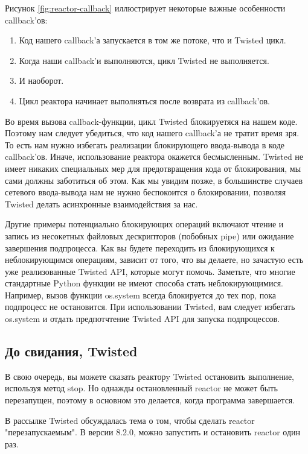 Рисунок \ref{fig:reactor-callback} иллюстрирует некоторые важные особенности 
callback'ов:

\begin{enumerate}
\item Код нашего callback'а запускается в том же потоке, что и Twisted цикл.
\item Когда наши callback'и выполняются, цикл Twisted не выполняется. 
\item И наоборот.
\item Цикл реактора начинает выполняться после возврата из callback'ов.
\end{enumerate}


Во время вызова callback-функции, цикл Twisted 
блокируетяся на нашем коде. Поэтому нам следует 
убедиться, что код нашего callback'а не тратит 
время зря. То есть нам нужно избегать реализации 
блокирующего ввода-вывода в коде callback'ов. 
Иначе, использование реактора окажется бесмысленным. 
Twisted не имеет никаких специальных мер для 
предотвращения кода от блокирования, мы сами 
должны заботиться об этом. Как мы увидим позже, 
в большинстве случаев сетевого ввода-вывода нам не 
нужно беспокоится о блокировании, позволяя Twisted делать 
асинхронные взаимодействия за нас.  


Другие примеры потенциально блокирующих операций 
включают чтение и запись из несокетных файловых 
дескрипторов (побобных pipe) или ожидание завершения 
подпроцесса. Как вы будете переходить 
из блокирующихся к неблокирующимся операциям, зависит от того, 
что вы делаете, но зачастую есть уже реализованные Twisted API, 
которые могут помочь. Заметьте, что многие стандартные 
Python функции не имеют способа стать неблокирующимися. Например, 
вызов функции os.system всегда блокируется до тех пор, пока 
подпроцесс не остановится. При использовании Twisted, вам 
следует избегать os.system и отдать предпотчтение Twisted API 
для запуска подпроцессов.


\subsection{До свидания, Twisted}


В свою очередь, вы можете сказать реакторy Twisted 
остановить выполнение, используя метод stop. Но однажды 
остановленный reactor не может быть перезапущен, поэтому 
в основном это делается, когда программа завершается. 


В рассылке Twisted обсуждалась тема о том, чтобы сделать 
reactor "перезапускаемым". В версии 8.2.0, можно запустить и остановить 
reactor один раз.


